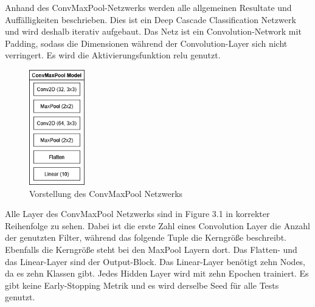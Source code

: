 Anhand des ConvMaxPool-Netzwerks werden alle allgemeinen Resultate und Auffälligkeiten beschrieben. 
Dies ist ein Deep Cascade Classification Netzwerk und wird deshalb iterativ aufgebaut. 
Das Netz ist ein Convolution-Network mit Padding, sodass die Dimensionen während der Convolution-Layer sich nicht verringert. 
Es wird die Aktivierungsfunktion relu genutzt. 

\begin{figure}[htpb]
    \includegraphics[height=5cm]{../../Graphiken/convmaxpool.png}
    \caption{\label{fig:convmaxpool} Vorstellung des ConvMaxPool Netzwerks}
\end{figure}

Alle Layer des ConvMaxPool Netzwerks sind in Figure 3.1 in korrekter Reihenfolge zu sehen. Dabei ist die erste Zahl eines Convolution Layer 
die Anzahl der genutzten Filter, während das folgende Tuple die Kerngröße beschreibt. Ebenfalls die Kerngröße steht bei den MaxPool Layern dort. 
Das Flatten- und das Linear-Layer sind der Output-Block. Das Linear-Layer benötigt zehn Nodes, da es zehn Klassen gibt. Jedes Hidden Layer wird 
mit zehn Epochen trainiert. Es gibt keine Early-Stopping Metrik und es wird derselbe Seed für alle Tests genutzt. 
